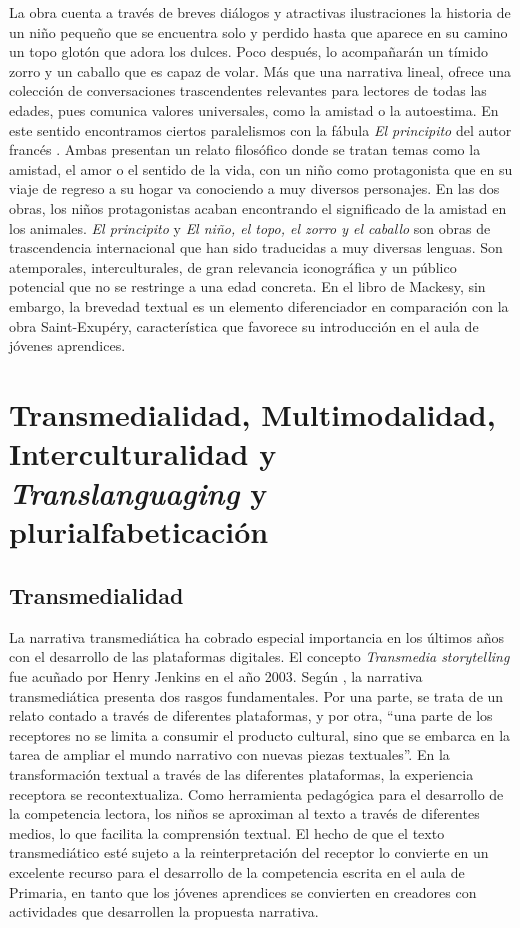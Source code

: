 \documentclass[spanish]{textolivre}
\begin{document}
La obra cuenta a través de breves diálogos y atractivas ilustraciones la historia de un niño pequeño que se encuentra solo y perdido hasta que aparece en su camino un topo glotón que adora los dulces. Poco después, lo acompañarán un tímido zorro y un caballo que es capaz de volar. Más que una narrativa lineal, ofrece una colección de conversaciones trascendentes relevantes para lectores de todas las edades, pues comunica valores universales, como la amistad o la autoestima. En este sentido encontramos ciertos paralelismos con la fábula \textit{El principito} del autor francés \textcite{de_saint-exupery_principito_2008}. Ambas presentan un relato filosófico donde se tratan temas como la amistad, el amor o el sentido de la vida, con un niño como protagonista que en su viaje de regreso a su hogar va conociendo a muy diversos personajes. En las dos obras, los niños protagonistas acaban encontrando el significado de la amistad en los animales. \textit{El principito} y \textit{El niño, el topo, el zorro y el caballo} son obras de trascendencia internacional que han sido traducidas a muy diversas lenguas. Son atemporales, interculturales, de gran relevancia iconográfica y un público potencial que no se restringe a una edad concreta. En el libro de Mackesy, sin embargo, la brevedad textual es un elemento diferenciador en comparación con la obra Saint-Exupéry, característica que favorece su introducción en el aula de jóvenes aprendices.


\section{Transmedialidad, Multimodalidad, Interculturalidad y \textit{Translanguaging} y plurialfabeticación}\label{sec-fmt-manuscrito}
\subsection{Transmedialidad}

La narrativa transmediática ha cobrado especial importancia en los últimos años con el desarrollo de las plataformas digitales. El concepto \textit{Transmedia storytelling} fue acuñado por Henry Jenkins en el año 2003. Según \textcite[p. 72]{scolari_narrativas_2014}, la narrativa transmediática presenta dos rasgos fundamentales. Por una parte, se trata de un relato contado a través de diferentes plataformas, y por otra, “una parte de los receptores no se limita a consumir el producto cultural, sino que se embarca en la tarea de ampliar el mundo narrativo con nuevas piezas textuales”. En la transformación textual a través de las diferentes plataformas, la experiencia receptora se recontextualiza. Como herramienta pedagógica para el desarrollo de la competencia lectora, los niños se aproximan al texto a través de diferentes medios, lo que facilita la comprensión textual.  El hecho de que el texto transmediático esté sujeto a la reinterpretación del receptor lo convierte en un excelente recurso para el desarrollo de la competencia escrita en el aula de Primaria, en tanto que los jóvenes aprendices se convierten en creadores con actividades que desarrollen la propuesta narrativa.
\end{document}

